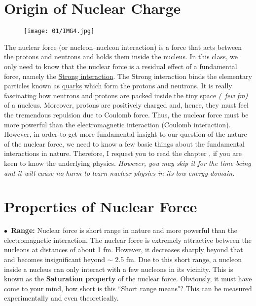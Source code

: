  \pagebreak   \section{Origin of Nuclear Charge}
            \begin{figure}
                \centering
                \texttt{[image: 01/IMG4.jpg]}
            \end{figure}
  The nuclear force (or nucleon–nucleon interaction) is a force that acts between the protons and neutrons and holds them inside the nucleus. In this class, we only need to know that the nuclear force is a residual effect of a fundamental force, namely the \href{https://en.wikipedia.org/wiki/Strong_interaction}{Strong interaction}. The Strong interaction binds the elementary particles known as \href{https://en.wikipedia.org/wiki/Quark}{quarks} which form the protons and neutrons.
      It is really fascinating how neutrons and protons are packed inside the tiny space \textit{(~few fm)} of a nucleus. Moreover, protons are positively charged and, hence, they must feel the tremendous repulsion due to Coulomb force. Thus, the nuclear force must be more powerful than the electromagnetic interaction (Coulomb interaction). However, in order to get more fundamental insight to our question of the nature of the nuclear force, we need to know a few basic things about the fundamental interactions in nature. Therefore, I request you to read the chapter , if you are keen to know the underlying physics.\textit{ However, you may skip it for the time being and it will cause no harm to learn nuclear physics in its low energy domain. }

\section{Properties of Nuclear Force}
        $\bullet$~\textbf{Range:} Nuclear force is short range in nature and more powerful than the electromagnetic interaction. The nuclear force is extremely attractive between the nucleons at distances of about 1 fm. However, it decreases sharply beyond that and becomes insignificant beyond $\sim$ 2.5 fm. Due to this short range, a nucleon inside a nucleus can only interact with a few nucleons in its vicinity. This is known as the \textbf{Saturation property} of the nuclear force. Obviously, it must have come to your mind, how short is this ``Short range means"? This can be measured experimentally and even theoretically.
        
